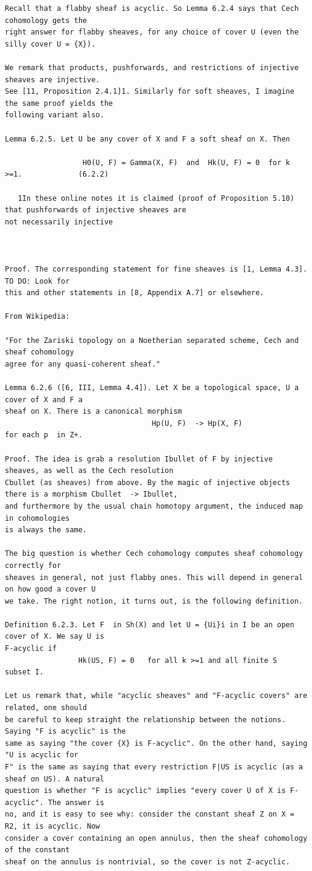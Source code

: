 \begin{Verbatim}[fontsize=\footnotesize]
Recall that a flabby sheaf is acyclic. So Lemma 6.2.4 says that Cech cohomology gets the
right answer for flabby sheaves, for any choice of cover U (even the silly cover U = {X}).

We remark that products, pushforwards, and restrictions of injective sheaves are injective.
See [11, Proposition 2.4.1]1. Similarly for soft sheaves, I imagine the same proof yields the
following variant also.

Lemma 6.2.5. Let U be any cover of X and F a soft sheaf on X. Then

                  H0(U, F) = Gamma(X, F)  and  Hk(U, F) = 0  for k >=1.             (6.2.2)

   1In these online notes it is claimed (proof of Proposition 5.10) that pushforwards of injective sheaves are
not necessarily injective



Proof. The corresponding statement for fine sheaves is [1, Lemma 4.3]. TO DO: Look for
this and other statements in [8, Appendix A.7] or elsewhere.

From Wikipedia:

"For the Zariski topology on a Noetherian separated scheme, Cech and sheaf cohomology
agree for any quasi-coherent sheaf."

Lemma 6.2.6 ([6, III, Lemma 4.4]). Let X be a topological space, U a cover of X and F a
sheaf on X. There is a canonical morphism
                                  Hp(U, F)  -> Hp(X, F)
for each p  in Z+.

Proof. The idea is grab a resolution Ibullet of F by injective sheaves, as well as the Cech resolution
Cbullet (as sheaves) from above. By the magic of injective objects there is a morphism Cbullet  -> Ibullet,
and furthermore by the usual chain homotopy argument, the induced map in cohomologies
is always the same.

The big question is whether Cech cohomology computes sheaf cohomology correctly for
sheaves in general, not just flabby ones. This will depend in general on how good a cover U
we take. The right notion, it turns out, is the following definition.

Definition 6.2.3. Let F  in Sh(X) and let U = {Ui}i in I be an open cover of X. We say U is
F-acyclic if
                 Hk(US, F) = 0   for all k >=1 and all finite S  subset I.

Let us remark that, while "acyclic sheaves" and "F-acyclic covers" are related, one should
be careful to keep straight the relationship between the notions. Saying "F is acyclic" is the
same as saying "the cover {X} is F-acyclic". On the other hand, saying "U is acyclic for
F" is the same as saying that every restriction F|US is acyclic (as a sheaf on US). A natural
question is whether "F is acyclic" implies "every cover U of X is F-acyclic". The answer is
no, and it is easy to see why: consider the constant sheaf Z on X = R2, it is acyclic. Now
consider a cover containing an open annulus, then the sheaf cohomology of the constant
sheaf on the annulus is nontrivial, so the cover is not Z-acyclic.



\end{Verbatim}

